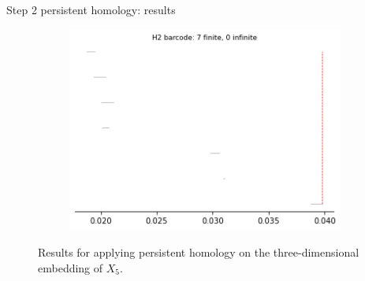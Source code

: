 \documentclass[xcolor={dvipsnames,svgnames}]{beamer}
\begin{document}
\begin{frame}{Step 2 persistent homology: results}
\begin{figure}[H]
\begin{subfigure}[b]{0.2\textwidth}
\includegraphics[width=\textwidth]{figures/X5_H2_barcode.png}
 \caption{}
\end{subfigure}
\caption{\scriptsize Results for applying persistent homology on the three-dimensional embedding of $X_5$.}
\end{figure}
\end{frame}
\end{document}
